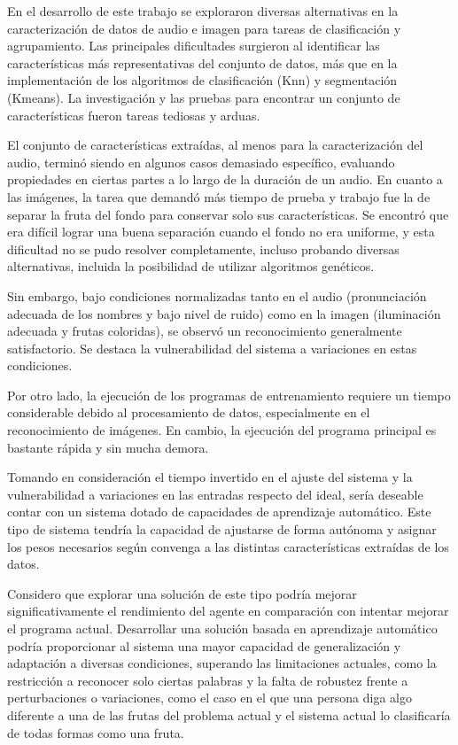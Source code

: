 \documentclass[a4paper, 12pt]{article}
\begin{document}
En el desarrollo de este trabajo se exploraron diversas alternativas en la caracterización de datos de audio e imagen para tareas de clasificación y agrupamiento. Las principales dificultades surgieron al identificar las características más representativas del conjunto de datos, más que en la implementación de los algoritmos de clasificación (Knn) y segmentación (Kmeans). La investigación y las pruebas para encontrar un conjunto de características fueron tareas tediosas y arduas.

El conjunto de características extraídas, al menos para la caracterización del audio, terminó siendo en algunos casos demasiado específico, evaluando propiedades en ciertas partes a lo largo de la duración de un audio. En cuanto a las imágenes, la tarea que demandó más tiempo de prueba y trabajo fue la de separar la fruta del fondo para conservar solo sus características. Se encontró que era difícil lograr una buena separación cuando el fondo no era uniforme, y esta dificultad no se pudo resolver completamente, incluso probando diversas alternativas, incluida la posibilidad de utilizar algoritmos genéticos.

Sin embargo, bajo condiciones normalizadas tanto en el audio (pronunciación adecuada de los nombres y bajo nivel de ruido) como en la imagen (iluminación adecuada y frutas coloridas), se observó un reconocimiento generalmente satisfactorio. Se destaca la vulnerabilidad del sistema a variaciones en estas condiciones.

Por otro lado, la ejecución de los programas de entrenamiento requiere un tiempo considerable debido al procesamiento de datos, especialmente en el reconocimiento de imágenes. En cambio, la ejecución del programa principal es bastante rápida y sin mucha demora.

Tomando en consideración el tiempo invertido en el ajuste del sistema y la vulnerabilidad a variaciones en las entradas respecto del ideal, sería deseable contar con un sistema dotado de capacidades de aprendizaje automático. Este tipo de sistema tendría la capacidad de ajustarse de forma autónoma y asignar los pesos necesarios según convenga a las distintas características extraídas de los datos.

Considero que explorar una solución de este tipo podría mejorar significativamente el rendimiento del agente en comparación con intentar mejorar el programa actual. Desarrollar una solución basada en aprendizaje automático podría proporcionar al sistema una mayor capacidad de generalización y adaptación a diversas condiciones, superando las limitaciones actuales, como la restricción a reconocer solo ciertas palabras y la falta de robustez frente a perturbaciones o variaciones, como el caso en el que una persona diga algo diferente a una de las frutas del problema actual y el sistema actual lo clasificaría de todas formas como una fruta.
\end{document}
